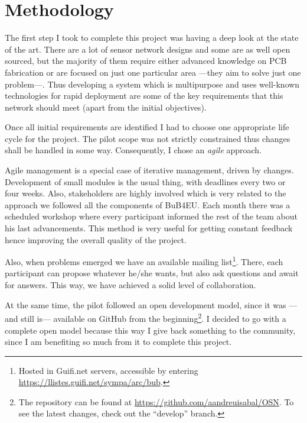 
\chapter{Methodology} %

\label{Chapter4} %



The first step I took to complete this project was having a deep look at the state of the art. There are a lot of sensor network designs and some are as well open sourced, but the majority of them require either advanced knowledge on PCB fabrication or are focused on just one particular area ---they aim to solve just one problem---. Thus developing a system which is multipurpose and uses well-known technologies for rapid deployment are some of the key requirements that this network should meet (apart from the initial objectives).

Once all initial requirements are identified I had to choose one appropriate life cycle for the project. The pilot scope was not strictly constrained thus changes shall be handled in some way. Consequently, I chose an \emph{agile} approach.

Agile management is a special case of iterative management, driven by changes\citep{pmbok_agile}. Development of small modules is the usual thing, with deadlines every two or four weeks. Also, stakeholders are highly involved which is very related to the approach we followed all the components of BuB4EU. Each month there was a scheduled workshop where every participant informed the rest of the team about his last advancements. This method is very useful for getting constant feedback hence improving the overall quality of the project.

Also, when problems emerged we have an available mailing list\footnote{Hosted in Guifi.net servers, accessible by entering \url{https://llistes.guifi.net/sympa/arc/bub}.}. There, each participant can propose whatever he/she wants, but also ask questions and await for answers. This way, we have achieved a solid level of collaboration.

At the same time, the pilot followed an open development model, since it was ---and still is--- available on GitHub from the beginning\footnote{The repository can be found at \url{https://github.com/aandreuisabal/OSN}. To see the latest changes, check out the ``develop'' branch.}. I decided to go with a complete open model because this way I give back something to the community, since I am benefiting so much from it to complete this project.
